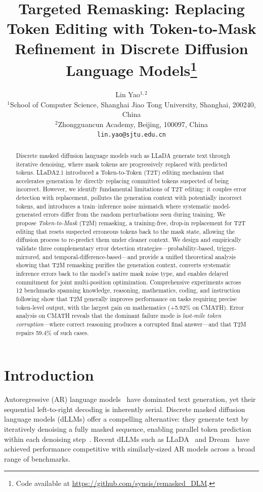 \documentclass{article}
\title{Targeted Remasking: Replacing Token Editing with Token-to-Mask Refinement in Discrete Diffusion Language Models\thanks{Code available at \url{https://github.com/synsis/remasked_DLM}.}}
\author{
  Lin Yao$^{1,2}$ \\
  $^1$School of Computer Science, Shanghai Jiao Tong University, Shanghai, 200240, China \\
  $^2$Zhongguancun Academy, Beijing, 100097, China \\
  \texttt{lin.yao@sjtu.edu.cn}
}
\begin{document}
\maketitle

\begin{abstract}
Discrete masked diffusion language models such as LLaDA generate text through iterative denoising, where mask tokens are progressively replaced with predicted tokens. LLaDA2.1 introduced a Token-to-Token (T2T) editing mechanism that accelerates generation by directly replacing committed tokens suspected of being incorrect. However, we identify fundamental limitations of T2T editing: it couples error detection with replacement, pollutes the generation context with potentially incorrect tokens, and introduces a train--inference noise mismatch where systematic model-generated errors differ from the random perturbations seen during training. We propose \emph{Token-to-Mask} (T2M) remasking, a training-free, drop-in replacement for T2T editing that resets suspected erroneous tokens back to the mask state, allowing the diffusion process to re-predict them under cleaner context. We design and empirically validate three complementary error detection strategies---probability-based, trigger-mirrored, and temporal-difference-based---and provide a unified theoretical analysis showing that T2M remasking purifies the generation context, converts systematic inference errors back to the model's native mask noise type, and enables delayed commitment for joint multi-position optimization. Comprehensive experiments across 12 benchmarks spanning knowledge, reasoning, mathematics, coding, and instruction following show that T2M generally improves performance on tasks requiring precise token-level output, with the largest gain on mathematics (+5.92\% on CMATH). Error analysis on CMATH reveals that the dominant failure mode is \emph{last-mile token corruption}---where correct reasoning produces a corrupted final answer---and that T2M repairs 59.4\% of such cases.
\end{abstract}

\section{Introduction}
\label{sec:intro}

Autoregressive (AR) language models~\citep{vaswani2017attention} have dominated text generation, yet their sequential left-to-right decoding is inherently serial. Discrete masked diffusion language models (dLLMs) offer a compelling alternative: they generate text by iteratively denoising a fully masked sequence, enabling parallel token prediction within each denoising step~\citep{austin2021d3pm,sahoo2024mdlm,lou2024sedd}. Recent dLLMs such as LLaDA~\citep{nie2025llada} and Dream~\citep{ye2025dream} have achieved performance competitive with similarly-sized AR models across a broad range of benchmarks.
\end{document}
